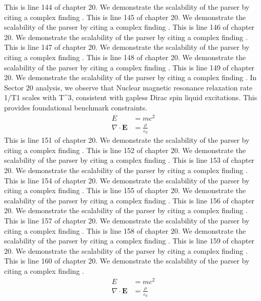 This is line 144 of chapter 20. We demonstrate the scalability of the parser by citing a complex finding \cite{ref20_144}.
This is line 145 of chapter 20. We demonstrate the scalability of the parser by citing a complex finding \cite{ref20_145}.
This is line 146 of chapter 20. We demonstrate the scalability of the parser by citing a complex finding \cite{ref20_146}.
This is line 147 of chapter 20. We demonstrate the scalability of the parser by citing a complex finding \cite{ref20_147}.
This is line 148 of chapter 20. We demonstrate the scalability of the parser by citing a complex finding \cite{ref20_148}.
This is line 149 of chapter 20. We demonstrate the scalability of the parser by citing a complex finding \cite{ref20_149}.
In Sector 20 analysis, we observe that Nuclear magnetic resonance relaxation rate 1/T1 scales with T^3, consistent with gapless Dirac spin liquid excitations. This provides foundational benchmark constraints.
\begin{align*}
  E &= mc^2 \\
  \nabla \cdot \mathbf{E} &= \frac{\rho}{\varepsilon_0}
\end{align*}
This is line 151 of chapter 20. We demonstrate the scalability of the parser by citing a complex finding \cite{ref20_151}.
This is line 152 of chapter 20. We demonstrate the scalability of the parser by citing a complex finding \cite{ref20_152}.
This is line 153 of chapter 20. We demonstrate the scalability of the parser by citing a complex finding \cite{ref20_153}.
This is line 154 of chapter 20. We demonstrate the scalability of the parser by citing a complex finding \cite{ref20_154}.
This is line 155 of chapter 20. We demonstrate the scalability of the parser by citing a complex finding \cite{ref20_155}.
This is line 156 of chapter 20. We demonstrate the scalability of the parser by citing a complex finding \cite{ref20_156}.
This is line 157 of chapter 20. We demonstrate the scalability of the parser by citing a complex finding \cite{ref20_157}.
This is line 158 of chapter 20. We demonstrate the scalability of the parser by citing a complex finding \cite{ref20_158}.
This is line 159 of chapter 20. We demonstrate the scalability of the parser by citing a complex finding \cite{ref20_159}.
This is line 160 of chapter 20. We demonstrate the scalability of the parser by citing a complex finding \cite{ref20_160}.
\begin{align*}
  E &= mc^2 \\
  \nabla \cdot \mathbf{E} &= \frac{\rho}{\varepsilon_0}
\end{align*}
